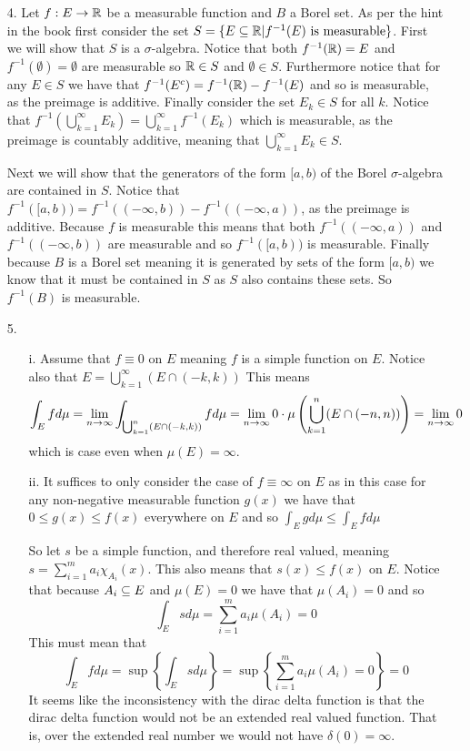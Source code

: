\documentclass[12pt]{amsart}
\begin{document}
\begin{itemize}
\begin{itemize}
   \end{itemize} 
   \item[4.] Let $f:E\rightarrow \mathbb{R}$ be a measurable function and $B$ a Borel set.
             As per the hint in the book first consider the set $S=\{E\subseteq \mathbb{R} | f^{-1}(E)\text{ is measurable}\}$.
             First we will show that $S$ is a $\sigma$-algebra. Notice that 
             both $f^{-1}(\mathbb{R})=E$ and $f^{-1}(\emptyset)=\emptyset$ are measurable so $\mathbb{R}\in S$ and $\emptyset\in S$.
             Furthermore notice that for any $E\in S$ we have that $f^{-1}(E^c)=f^{-1}(\mathbb{R})-f^{-1}(E)$ and so is measurable, as the preimage is additive. 
             Finally consider the set $E_k\in S$ for all $k$. Notice that $f^{-1}(\bigcup_{k=1}^\infty E_k)=\bigcup_{k=1}^\infty f^{-1}(E_k)$
             which is measurable, as the preimage is countably additive, meaning that $\bigcup_{k=1}^\infty E_k\in S$.
             
             Next we will show that the generators of the form $[a,b)$ of the Borel $\sigma$-algebra are contained in $S$. 
             Notice that $f^{-1}([a,b))=f^{-1}((-\infty, b))-f^{-1}((-\infty, a))$, as the preimage is additive.
             Because $f$ is measurable this means that both $f^{-1}((-\infty, a))$ and $f^{-1}((-\infty, b))$
             are measurable and so $f^{-1}([a,b))$ is measurable. Finally because 
             $B$ is a Borel set meaning it is generated by sets of the form $[a,b)$ we know that it must be contained in $S$
             as $S$ also contains these sets. So $f^{-1}(B)$ is measurable.


    \item[5.] 
    \begin{itemize}
        \item[i.] Assume that $f\equiv 0$ on $E$ meaning $f$ is a simple function on $E$. Notice also that $E=\bigcup_{k=1}^{\infty}(E\cap(-k,k))$ This means
              \[\int_E f d\mu= \lim_{n\rightarrow \infty}\int_{\bigcup_{k=1}^{n}(E\cap(-k,k))} f d\mu=\lim_{n\rightarrow \infty}0\cdot\mu\left(\bigcup_{k=1}^{n}(E\cap(-n,n))\right)=\lim_{n\rightarrow \infty} 0\]
              which is case even when $\mu(E)=\infty$. %
        \item[ii.] It suffices to only consider the case of $f\equiv \infty$ on $E$ as in this case for any non-negative 
        measurable function $g(x)$ we have that $0\leq g(x)\leq f(x)$ everywhere on $E$ and so $\int_E g d\mu\leq \int_E f d\mu$

        So let $s$ be a simple function, and therefore real valued, meaning $s=\sum_{i=1}^m a_i \chi_{A_i}(x)$. 
        This also means that $s(x)\leq f(x)$ on $E$. Notice that because $A_i\subseteq E$ and $\mu(E)=0$ we have that $\mu(A_i)=0$ and so
        \[\int_E s d\mu=\sum_{i=1}^m a_i\mu(A_i)=0\]
        This must mean that 
        \[\int_E f d\mu=\sup\left\{\int_E s d\mu\right\} = \sup\left\{\sum_{i=1}^m a_i\mu(A_i)=0\right\}=0\]
        It seems like the inconsistency with the dirac delta function is that the dirac delta function would not be
        an extended real valued function. That is, over the extended real number we would not have $\delta(0)=\infty$. 


\end{itemize}
\end{itemize}
\end{document}
